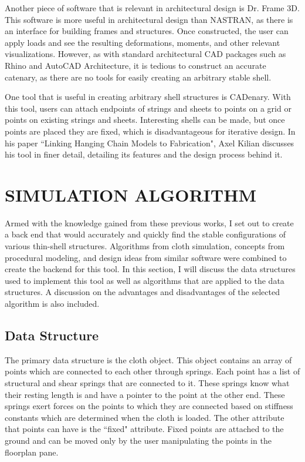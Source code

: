 \documentclass{thesis}
\begin{document}
Another piece of software that is relevant in architectural design is Dr. Frame 3D\cite{drframe}.  This
software is more useful in architectural design than NASTRAN, as there is an interface for building frames and structures.
Once constructed, the user can apply loads and see the resulting deformations, moments, and other relevant
visualizations.  However, as with standard architectural CAD packages such as Rhino\cite{rhino} and
AutoCAD Architecture\cite{autocad}, it is tedious to construct an accurate catenary, as there are no
tools for easily creating an arbitrary stable shell.

One tool that is useful in creating arbitrary shell structures is CADenary\cite{cadenary}.  With this tool,
users can attach endpoints of strings and sheets to points on a grid or points on existing strings and sheets.
Interesting shells can be made, but once points are placed they are fixed, which is disadvantageous for
iterative design.  In his paper ``Linking Hanging Chain Models to Fabrication"\cite{kilian05cadenary}, Axel Kilian
discusses his tool in finer detail, detailing its features and the design process behind it.


\chapter{SIMULATION ALGORITHM}
Armed with the knowledge gained from these previous works, I set out to create a back end that would accurately
and quickly find the stable configurations of various thin-shell structures.  Algorithms from cloth simulation,
concepts from procedural modeling, and design ideas from similar software were combined to create the backend for
this tool.  In this section, I will discuss the data structures used to implement this tool as well as algorithms
that are applied to the data structures.  A discussion on the advantages and disadvantages of the selected algorithm
is also included.

\section{Data Structure}
The primary data structure is the cloth object.  This object contains an array of points which are connected to each other through springs.
Each point has a list of structural and shear springs that are connected to it.  These springs know what their resting length is and have
a pointer to the point at the other end.  These springs exert forces on the points to which they are connected based on stiffness constants
which are determined when the cloth is loaded.  The other attribute that points can have is the ``fixed" attribute.  Fixed points are
attached to the ground and can be moved only by the user manipulating the points in the floorplan pane.
\end{document}
